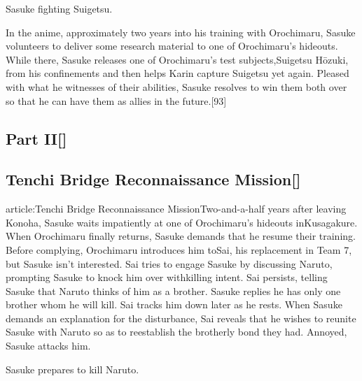 \documentclass[a4paper,12pt]{article}
\begin{document}
Sasuke fighting Suigetsu.\\ \par \vspace{0.5cm}

In the anime, approximately two years into his training with Orochimaru, Sasuke volunteers to deliver some research material to one of Orochimaru's hideouts. While there, Sasuke releases one of Orochimaru's test subjects,Suigetsu Hōzuki, from his confinements and then helps Karin capture Suigetsu yet again. Pleased with what he witnesses of their abilities, Sasuke resolves to win them both over so that he can have them as allies in the future.[93]\\ \par \vspace{0.5cm}

\subsection*{Part II[]}\n\n\subsection*{Tenchi Bridge Reconnaissance Mission[]}\n\nMain article:Tenchi Bridge Reconnaissance MissionTwo-and-a-half years after leaving Konoha, Sasuke waits impatiently at one of Orochimaru's hideouts inKusagakure. When Orochimaru finally returns, Sasuke demands that he resume their training. Before complying, Orochimaru introduces him toSai, his replacement in Team 7, but Sasuke isn't interested. Sai tries to engage Sasuke by discussing Naruto, prompting Sasuke to knock him over withkilling intent. Sai persists, telling Sasuke that Naruto thinks of him as a brother. Sasuke replies he has only one brother whom he will kill. Sai tracks him down later as he rests. When Sasuke demands an explanation for the disturbance, Sai reveals that he wishes to reunite Sasuke with Naruto so as to reestablish the brotherly bond they had. Annoyed, Sasuke attacks him.\\ \par \vspace{0.5cm}

Sasuke prepares to kill Naruto.\\ \par \vspace{0.5cm}
\end{document}
